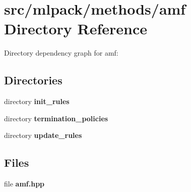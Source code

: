 \section{src/mlpack/methods/amf Directory Reference}
\label{dir_a3ffaa2d195dc9172e51a3924a7fb231}
Directory dependency graph for amf\-:
\subsection*{Directories}
\begin{DoxyCompactItemize}
\item 
directory {\bf init\-\_\-rules}
\item 
directory {\bf termination\-\_\-policies}
\item 
directory {\bf update\-\_\-rules}
\end{DoxyCompactItemize}
\subsection*{Files}
\begin{DoxyCompactItemize}
\item 
file {\bf amf.\-hpp}
\end{DoxyCompactItemize}
